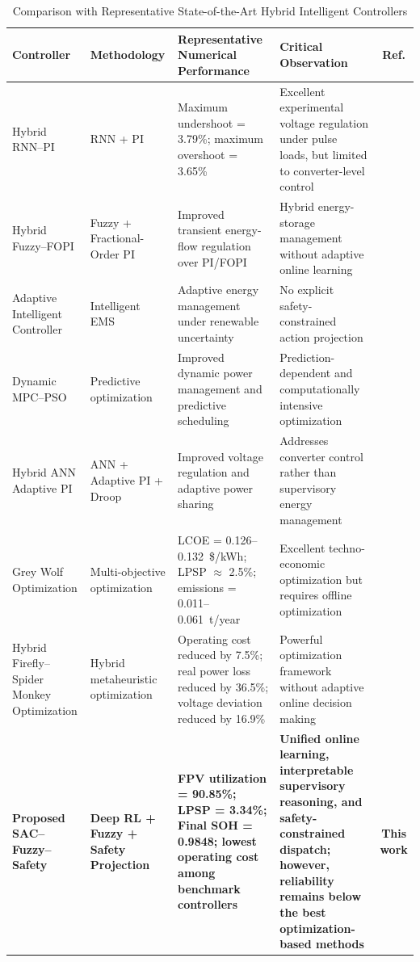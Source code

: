 \documentclass[journal]{IEEEtran}
\begin{document}
\begin{table}[!t]
\caption{Comparison with Representative State-of-the-Art Hybrid Intelligent Controllers}
\label{tab:r11}
\centering
\scriptsize
\renewcommand{\arraystretch}{1.2}
\setlength{\tabcolsep}{4pt}
\begin{tabular}{p{2.8cm}p{2.8cm}p{4.6cm}p{4.5cm}c}
\toprule
\textbf{Controller} &
\textbf{Methodology} &
\textbf{Representative Numerical Performance} &
\textbf{Critical Observation} &
\textbf{Ref.}\\
\midrule

Hybrid RNN--PI &
RNN + PI &
Maximum undershoot = 3.79\%; maximum overshoot = 3.65\% &
Excellent experimental voltage regulation under pulse loads, but limited to converter-level control &
\cite{Aghmadi2025}\\

Hybrid Fuzzy--FOPI &
Fuzzy + Fractional-Order PI &
Improved transient energy-flow regulation over PI/FOPI &
Hybrid energy-storage management without adaptive online learning &
\cite{Kumar2023}\\

Adaptive Intelligent Controller &
Intelligent EMS &
Adaptive energy management under renewable uncertainty &
No explicit safety-constrained action projection &
\cite{Rajput2025}\\

Dynamic MPC--PSO &
Predictive optimization &
Improved dynamic power management and predictive scheduling &
Prediction-dependent and computationally intensive optimization &
\cite{Veni2025}\\

Hybrid ANN Adaptive PI &
ANN + Adaptive PI + Droop &
Improved voltage regulation and adaptive power sharing &
Addresses converter control rather than supervisory energy management &
\cite{Adiche2024}\\

Grey Wolf Optimization &
Multi-objective optimization &
LCOE = 0.126--0.132~\$/kWh; LPSP $\approx$ 2.5\%; emissions = 0.011--0.061~t/year &
Excellent techno-economic optimization but requires offline optimization &
\cite{Tukkee2024}\\

Hybrid Firefly--Spider Monkey Optimization &
Hybrid metaheuristic optimization &
Operating cost reduced by 7.5\%; real power loss reduced by 36.5\%; voltage deviation reduced by 16.9\% &
Powerful optimization framework without adaptive online decision making &
\cite{Pramila2024}\\

\textbf{Proposed SAC--Fuzzy--Safety} &
\textbf{Deep RL + Fuzzy + Safety Projection} &
\textbf{FPV utilization = 90.85\%; LPSP = 3.34\%; Final SOH = 0.9848; lowest operating cost among benchmark controllers} &
\textbf{Unified online learning, interpretable supervisory reasoning, and safety-constrained dispatch; however, reliability remains below the best optimization-based methods} &
\textbf{This work}\\

\bottomrule
\end{tabular}
\end{table}
\end{document}
